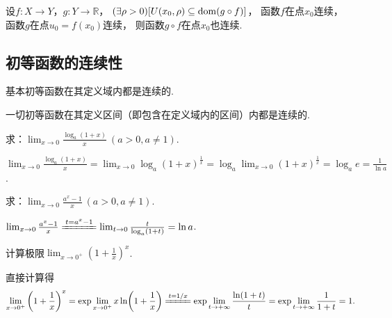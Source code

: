 \begin{theorem}\label{theorem:极限.连续函数的极限4}
设\(f\colon X \to Y\)，\(g\colon Y\to\mathbb{R}\)，
\((\exists\rho>0)[U(x_0,\rho) \subseteq \operatorname{dom}(g \circ f)]\)，
函数\(f\)在点\(x_0\)连续，
函数\(g\)在点\(u_0 = f(x_0)\)连续，
则函数\(g \circ f\)在点\(x_0\)也连续.
\end{theorem}

\subsection{初等函数的连续性}
\begin{theorem}
基本初等函数在其定义域内都是连续的.
\end{theorem}

\begin{corollary}
一切初等函数在其定义区间（即包含在定义域内的区间）内都是连续的.
\end{corollary}

\begin{example}
求：\(\lim_{x\to0} \frac{\log_a (1+x)}{x}\ (a>0,a\neq1)\).
\begin{solution}
\(\lim_{x\to0} \frac{\log_a (1+x)}{x}
= \lim_{x\to0} \log_a (1+x)^{\frac{1}{x}}
= \log_a \lim_{x\to0} (1+x)^{\frac{1}{x}}
= \log_a e
= \frac{1}{\ln a}\).
\end{solution}
\end{example}

\begin{example}
求：\(\lim_{x\to0} \frac{a^x - 1}{x}\ (a>0,a\neq1)\).
\begin{solution}
\(\lim_{x\to0} \frac{a^x - 1}{x}
\xlongequal{t=a^x-1} \lim_{t\to0}\frac{t}{\log_a (1+t)}
= \ln a\).
\end{solution}
\end{example}

\begin{example}
计算极限\(\lim_{x\to0^+} \left(1+\frac1x\right)^x\).
\begin{solution}
直接计算得\begin{equation*}
	\lim_{x\to0^+} \left(1+\frac1x\right)^x
	= \exp\lim_{x\to0^+} x\ln(1+\frac1x) %
	\xlongequal{t=1/x} \exp\lim_{t\to+\infty} \frac{\ln(1+t)}{t} %
	= \exp\lim_{t\to+\infty} \frac1{1+t} %
	= 1.
\end{equation*}
\end{solution}
\end{example}

